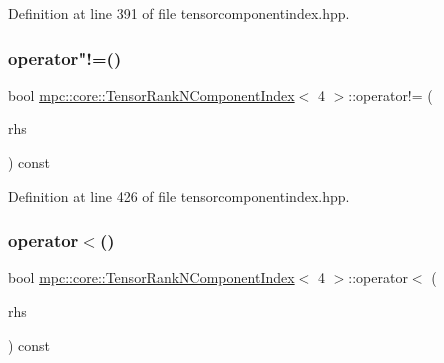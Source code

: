 Definition at line 391 of file tensorcomponentindex.\+hpp.

\mbox{\label{classmpc_1_1core_1_1_tensor_rank_n_component_index_3_014_01_4_a7263c75cd59cf45d97c8ae280b032bbe}} 
\subsubsection{\texorpdfstring{operator"!=()}{operator!=()}}
{\footnotesize\ttfamily bool \mbox{\hyperlink{classmpc_1_1core_1_1_tensor_rank_n_component_index}{mpc\+::core\+::\+Tensor\+Rank\+N\+Component\+Index}}$<$ 4 $>$\+::operator!= (\begin{DoxyParamCaption}\item[{const \mbox{\hyperlink{classmpc_1_1core_1_1_tensor_rank_n_component_index}{Tensor\+Rank\+N\+Component\+Index}}$<$ 4 $>$ \&}]{rhs }\end{DoxyParamCaption}) const\hspace{0.3cm}{\ttfamily [inline]}}



Definition at line 426 of file tensorcomponentindex.\+hpp.

\mbox{\label{classmpc_1_1core_1_1_tensor_rank_n_component_index_3_014_01_4_ab7900b113b5c24f52e524a04121d9a0e}} 
\subsubsection{\texorpdfstring{operator$<$()}{operator<()}}
{\footnotesize\ttfamily bool \mbox{\hyperlink{classmpc_1_1core_1_1_tensor_rank_n_component_index}{mpc\+::core\+::\+Tensor\+Rank\+N\+Component\+Index}}$<$ 4 $>$\+::operator$<$ (\begin{DoxyParamCaption}\item[{const \mbox{\hyperlink{classmpc_1_1core_1_1_tensor_rank_n_component_index}{Tensor\+Rank\+N\+Component\+Index}}$<$ 4 $>$ \&}]{rhs }\end{DoxyParamCaption}) const\hspace{0.3cm}{\ttfamily [inline]}}



